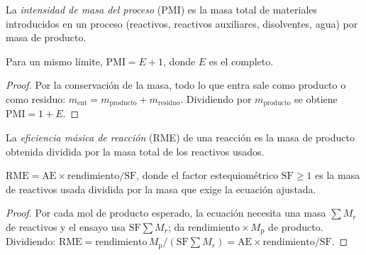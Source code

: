 \begin{definition}\label{def:b3:green-industrial:pmi}
La \emph{intensidad de masa del proceso} (PMI) es la
masa total de materiales introducidos en un proceso (reactivos, reactivos auxiliares, disolventes,
agua) por masa de producto.
\end{definition}

\begin{proposition}\label{prop:b3:green-industrial:pmi-e}
Para un mismo límite, $\mathrm{PMI} = E + 1$, donde $E$ es el  completo.
\end{proposition}

\begin{proof}
Por la conservación de la masa, todo lo que entra sale como producto o como residuo:
$m_{\mathrm{ent}} = m_{\mathrm{producto}} + m_{\mathrm{residuo}}$. Dividiendo por $m_{\mathrm{producto}}$ se obtiene $\mathrm{PMI} = 1 + E$.
\end{proof}

\begin{definition}\label{def:b3:green-industrial:rme}
La \emph{eficiencia másica de reacción} (RME) de una
reacción es la masa de producto obtenida dividida por la masa total de los
reactivos usados.
\end{definition}

\begin{proposition}\label{prop:b3:green-industrial:rme}
$\mathrm{RME} = \mathrm{AE} \times \text{rendimiento}/\mathrm{SF}$, donde el factor estequiométrico $\mathrm{SF} \ge 1$ es la masa de
reactivos usada dividida por la masa que exige la ecuación ajustada.
\end{proposition}

\begin{proof}
Por cada mol de producto esperado, la ecuación necesita una masa $\sum M_r$ de reactivos y
el ensayo usa $\mathrm{SF}\sum M_r$; da $\text{rendimiento} \times M_{\mathrm p}$ de producto. Dividiendo:
$\mathrm{RME} = \text{rendimiento}\,M_{\mathrm p}/(\mathrm{SF}\sum M_r) = \mathrm{AE} \times \text{rendimiento}/\mathrm{SF}$.
\end{proof}

